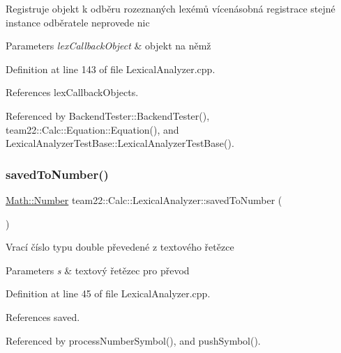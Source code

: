 Registruje objekt k odběru rozeznaných lexémů vícenásobná registrace stejné instance odběratele neprovede nic


\begin{DoxyParams}{Parameters}
{\em lex\+Callback\+Object} & objekt na němž \\
\hline
\end{DoxyParams}


Definition at line 143 of file Lexical\+Analyzer.\+cpp.



References lex\+Callback\+Objects.



Referenced by Backend\+Tester\+::\+Backend\+Tester(), team22\+::\+Calc\+::\+Equation\+::\+Equation(), and Lexical\+Analyzer\+Test\+Base\+::\+Lexical\+Analyzer\+Test\+Base().

\mbox{\label{classteam22_1_1_calc_1_1_lexical_analyzer_a689b52c49cd7c9e87dd468987472af83}} 
\subsubsection{\texorpdfstring{saved\+To\+Number()}{savedToNumber()}}
{\footnotesize\ttfamily \hyperlink{classteam22_1_1_math_1_1_number}{Math\+::\+Number} team22\+::\+Calc\+::\+Lexical\+Analyzer\+::saved\+To\+Number (\begin{DoxyParamCaption}{ }\end{DoxyParamCaption})\hspace{0.3cm}{\ttfamily [private]}}

Vrací číslo typu double převedené z textového řetězce 
\begin{DoxyParams}{Parameters}
{\em s} & textový řetězec pro převod \\
\hline
\end{DoxyParams}


Definition at line 45 of file Lexical\+Analyzer.\+cpp.



References saved.



Referenced by process\+Number\+Symbol(), and push\+Symbol().

